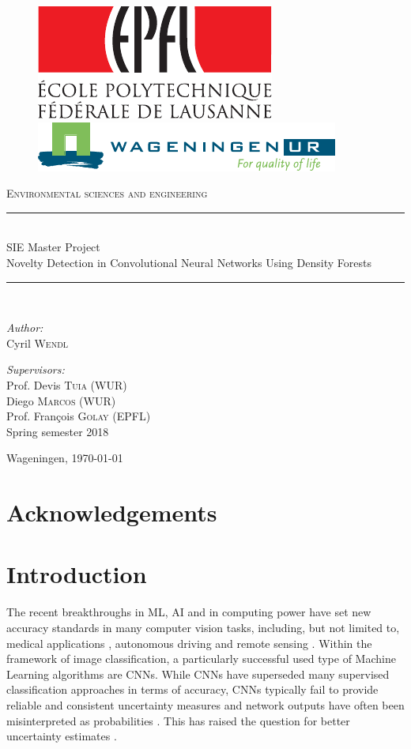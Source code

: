 \documentclass[10pt]{article}
\newcommand{\maketitlepage}{
    \begin{titlepage}
    	\begin{center}
    		\begin{figure}[H]
    			\centering
    			\includegraphics[height=.09\textwidth]{logo} 
    			\hspace{1cm}
    			\includegraphics[height=.07\textwidth]{logo_wur_quality_of_life}
    		\end{figure}
    		\textsc{Environmental sciences and engineering}\\[0.5cm]
    		
    		\newcommand{\HRule}{\rule{\linewidth}{0.2mm}}
    		\HRule \\[0.5cm]
    		{\large SIE Master Project}\\[0.2cm]
    		{\huge Novelty Detection in Convolutional Neural Networks Using Density Forests
    		}\\[0.5cm]
    		\HRule \\[0.5cm]
    		
    		\begin{minipage}[t]{0.45\textwidth}
    			\begin{flushleft} \large
    				\emph{Author:}\\[0.2cm]
    				Cyril \textsc{Wendl}
    			\end{flushleft}
    		\end{minipage}
    		\hfill
    		\begin{minipage}[t]{0.45\textwidth}
    			\begin{flushright} \large
    				\emph{Supervisors:}\\[0.2cm]
    				Prof. Devis \textsc{Tuia} (WUR)\\
    				Diego \textsc{Marcos} (WUR)\\
    				Prof. François \textsc{Golay} (EPFL)\\
    				Spring semester 2018
    			\end{flushright}
    		\end{minipage}
    		\vfill
    		
    		{\large Wageningen, \today}
    	\end{center}
    \end{titlepage}
}
\begin{document}
\maketitlepage

\thispagestyle{empty}
\section*{Acknowledgements}



\newpage
{}
\tableofcontents
{}
\listoffigures
{}
\listoftables
\clearpage
\printglossaries
\clearpage

\setcounter{page}{1}

\begin{abstract}
    Uncertainty in deep learning has recently received a lot of attention in research. While state-of-the-art neural networks have managed to break many benchmarks in terms of accuracy, it has been shown that they are susceptible to fooling, yielding unreasonably high confidence scores while being wrong by applying minor perturbations to the input. While some research has gone into the design of new architectures that are probabilistic in nature, such as Bayesian Neural Networks, other researchers have tried to model uncertainty of standard architectures heuristically. This work presents a novel method to assess uncertainty in \glspl{CNN}, based on fitting a forests of randomized Decision Trees to the network activations. Experiments are provided for the patch classification on the MNIST dataset and semantic segmentation on satellite imagery for land cover classification. The method is evaluated with respect to its performance in novelty detection and error detection.\\
    
    \textbf{Keywords}: Uncertainty, neural networks, Decision Trees, Density Forest, novelty detection, patch classification, semantic segmentation, remote sensing, land cover classification
\end{abstract}

\section{Introduction}
The recent breakthroughs in \gls{ML}, \gls{AI} and in computing power have set new accuracy standards in many computer vision tasks, including, but not limited to, medical applications \cite{leibig2017, ronneberger2015u}, autonomous driving \cite{Levinson2011TowardsFA} and remote sensing \cite{Volpi2017DenseSL, kampffmeyer, Zhu2017DeepLI, Shelhamer2015FullyCN}. Within the framework of image classification, a particularly successful used type of Machine Learning algorithms are \glspl{CNN}. While \glspl{CNN} have superseded many supervised classification approaches in terms of accuracy, \glspl{CNN} typically fail to provide reliable and consistent uncertainty measures and network outputs have often been misinterpreted as probabilities \cite{NguyenYC14, Goodfellow2014}. This has raised the question for better uncertainty estimates \cite{KendallG17, Gal2016Uncertainty}.
\end{document}
